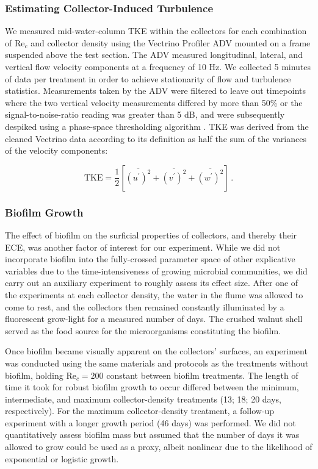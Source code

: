\documentclass[geosciences,article,submit,moreauthors,pdftex]{Definitions/mdpi}
\newcommand\Rey{\mathrm{Re}}
\begin{document}
\subsubsection{Estimating Collector-Induced Turbulence}

We measured mid-water-column TKE within the collectors for each combination of $\Rey_c$ and collector density using the Vectrino Profiler ADV mounted on a frame suspended above the test section. The ADV measured longitudinal, lateral, and vertical flow velocity components at a frequency of 10 Hz. We collected 5 minutes of data per treatment in order to achieve stationarity of flow and turbulence statistics. Measurements taken by the ADV were filtered to leave out timepoints where the two vertical velocity measurements differed by more than 50\% or the signal-to-noise-ratio reading was greater than 5 dB, and were subsequently despiked using a phase-space thresholding algorithm \cite{goring_nikora}. TKE was derived from the cleaned Vectrino data according to its definition as half the sum of the variances of the velocity components:

\begin{equation}
    \text{TKE} = \frac{1}{2}[\overline{(u^\prime)^2} + \overline{(v^\prime)^2} + \overline{(w^\prime)^2}]\,.
    \label{eqn:TKE}
\end{equation}

\subsubsection{Biofilm Growth}

The effect of biofilm on the surficial properties of collectors, and thereby their ECE, was another factor of interest for our experiment. While we did not incorporate biofilm into the fully-crossed parameter space of other explicative variables due to the time-intensiveness of growing microbial communities, we did carry out an auxiliary experiment to roughly assess its effect size. After one of the experiments at each collector density, the water in the flume was allowed to come to rest, and the collectors then remained constantly illuminated by a fluorescent grow-light for a measured number of days. The crushed walnut shell served as the food source for the microorganisms constituting the biofilm.

Once biofilm became visually apparent on the collectors' surfaces, an experiment was conducted using the same materials and protocols as the treatments without biofilm, holding $\Rey_c = 200$ constant between biofilm treatments. The length of time it took for robust biofilm growth to occur differed between the minimum, intermediate, and maximum collector-density treatments (13; 18; 20 days, respectively). For the maximum collector-density treatment, a follow-up experiment with a longer growth period (46 days) was performed. We did not quantitatively assess biofilm mass but assumed that the number of days it was allowed to grow could be used as a proxy, albeit nonlinear due to the likelihood of exponential or logistic growth.
\end{document}
